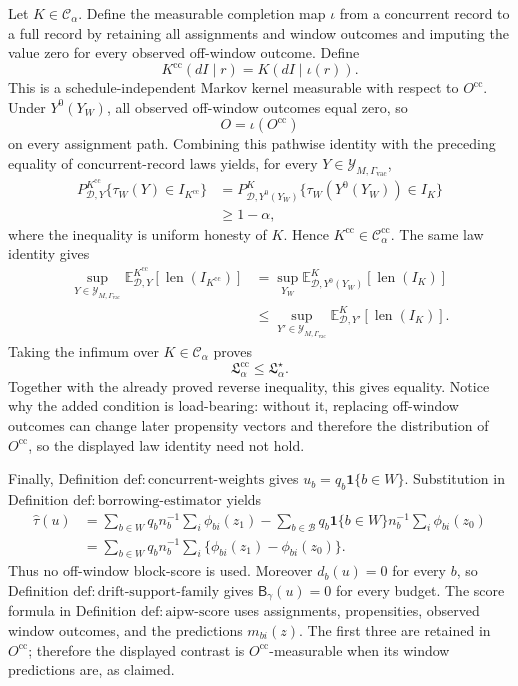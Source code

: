 Let \(K\in\mathcal C_\alpha\).  Define the measurable completion map \(\iota\) from a concurrent record to a full record by retaining all assignments and window outcomes and imputing the value zero for every observed off-window outcome.  Define
\[
 K^{\mathrm{cc}}(dI\mid r)=K(dI\mid\iota(r)).
\]
This is a schedule-independent Markov kernel measurable with respect to \(O^{\mathrm{cc}}\).  Under \(Y^0(Y_W)\), all observed off-window outcomes equal zero, so
\[
 O=\iota(O^{\mathrm{cc}})
\]
on every assignment path.  Combining this pathwise identity with the preceding equality of concurrent-record laws yields, for every \(Y\in\mathcal Y_{M,\Gamma_{\mathrm{vac}}}\),
\[
 \begin{aligned}
 P^{K^{\mathrm{cc}}}_{\mathcal D,Y}
 \{\tau_W(Y)\in I_{K^{\mathrm{cc}}}\}
 &=P^K_{\mathcal D,Y^0(Y_W)}
 \{\tau_W(Y^0(Y_W))\in I_K\}\\
 &\ge1-\alpha,
 \end{aligned}
\]
where the inequality is uniform honesty of \(K\).  Hence \(K^{\mathrm{cc}}\in\mathcal C_\alpha^{\mathrm{cc}}\).  The same law identity gives
\[
 \begin{aligned}
 \sup_{Y\in\mathcal Y_{M,\Gamma_{\mathrm{vac}}}}
 \mathbb E^{K^{\mathrm{cc}}}_{\mathcal D,Y}
 [\operatorname{len}(I_{K^{\mathrm{cc}}})]
 &=\sup_{Y_W}
 \mathbb E^K_{\mathcal D,Y^0(Y_W)}
 [\operatorname{len}(I_K)]\\
 &\le\sup_{Y'\in\mathcal Y_{M,\Gamma_{\mathrm{vac}}}}
 \mathbb E^K_{\mathcal D,Y'}[\operatorname{len}(I_K)].
 \end{aligned}
\]
Taking the infimum over \(K\in\mathcal C_\alpha\) proves
\[
 \mathfrak L_\alpha^{\mathrm{cc}}\le\mathfrak L_\alpha^\star.
\]
Together with the already proved reverse inequality, this gives equality.  Notice why the added condition is load-bearing: without it, replacing off-window outcomes can change later propensity vectors and therefore the distribution of \(O^{\mathrm{cc}}\), so the displayed law identity need not hold.

Finally, Definition \(\mathrm{def:concurrent\text{-}weights}\) gives \(u_b=q_b\mathbf 1\{b\in W\}\).  Substitution in Definition \(\mathrm{def:borrowing\text{-}estimator}\) yields
\[
 \begin{aligned}
 \widehat\tau(u)
 &=\sum_{b\in W}q_bn_b^{-1}\sum_i\phi_{bi}(z_1)
 -\sum_{b\in\mathcal B}q_b\mathbf 1\{b\in W\}n_b^{-1}\sum_i\phi_{bi}(z_0)\\
 &=\sum_{b\in W}q_bn_b^{-1}\sum_i
 \{\phi_{bi}(z_1)-\phi_{bi}(z_0)\}.
 \end{aligned}
\]
Thus no off-window block-score is used.  Moreover \(d_b(u)=0\) for every \(b\), so Definition \(\mathrm{def:drift\text{-}support\text{-}family}\) gives \(\mathsf B_\gamma(u)=0\) for every budget.  The score formula in Definition \(\mathrm{def:aipw\text{-}score}\) uses assignments, propensities, observed window outcomes, and the predictions \(m_{bi}(z)\).  The first three are retained in \(O^{\mathrm{cc}}\); therefore the displayed contrast is \(O^{\mathrm{cc}}\)-measurable when its window predictions are, as claimed.

